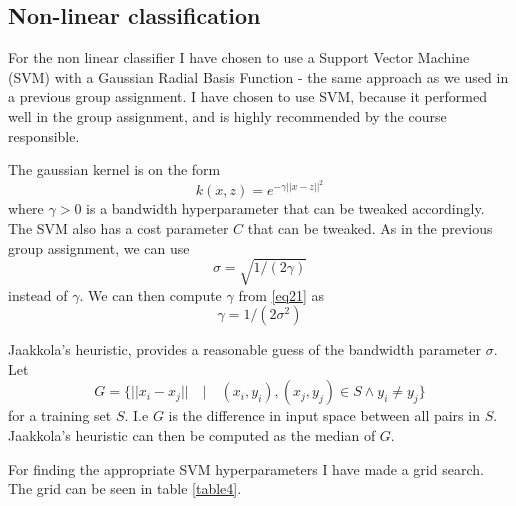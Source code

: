 \documentclass[10pt]{article}
\begin{document}

\subsection*{Non-linear classification} %
\label{sub:non_linear_classification}
For the non linear classifier I have chosen to use a Support Vector Machine (SVM) with a Gaussian Radial Basis Function - the same approach as we used in a previous group assignment\cite{assignment3}. I have chosen to use SVM, because it performed well in the group assignment, and is highly recommended by the course responsible.

The gaussian kernel is on the form 
\begin{equation}
  k(x,z) = e^{-\gamma||x-z||^2}
\end{equation}
where $\gamma>0$ is a bandwidth hyperparameter that can be tweaked accordingly. The SVM also has a cost parameter $C$ that can be tweaked. As in the previous group assignment, we can use 
\begin{equation}
  \sigma = \sqrt{1/(2\gamma)}
  \label{eq21}
\end{equation}
instead of $\gamma$. We can then compute $\gamma$ from \ref{eq21} as
\begin{equation}
  \gamma = 1/(2\sigma^2)  
\end{equation} 

Jaakkola's heuristic, provides a reasonable guess of the bandwidth parameter $\sigma$\cite{assignment3}. Let 
\begin{equation}
  G = \{ ||x_i - x_j||\quad | \quad (x_i,y_i),(x_j,y_j) \in S \wedge y_i \neq y_j \}
\end{equation}
for a training set $S$. I.e $G$ is the difference in input space between all pairs in $S$. Jaakkola's heuristic can then be computed as the median of $G$. 

For finding the appropriate SVM hyperparameters I have made a grid search. The grid can be seen in table \ref{table4}.  
\end{document}
